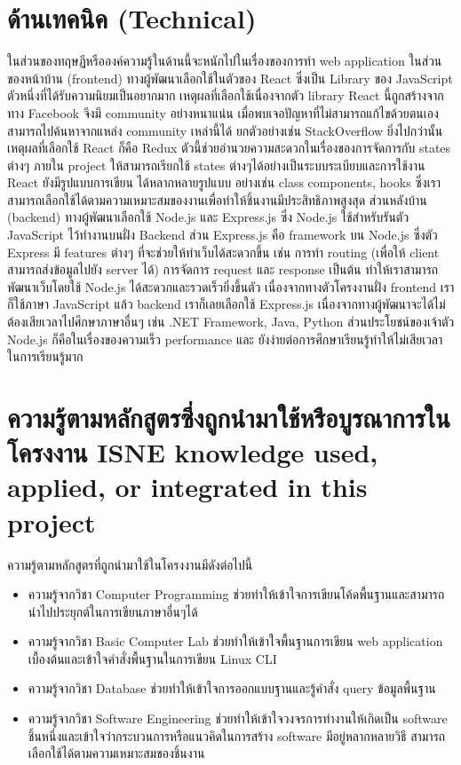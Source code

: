 \section{ด้านเทคนิค (Technical)}
ในส่วนของทฤษฏีหรือองค์ความรู้ในด้านนี้จะหนักไปในเรื่องของการทำ
web application ในส่วนของหน้าบ้าน (frontend) ทางผู้พัฒนาเลือกใช้ในตัวของ
React \cite{React} ซึ่งเป็น Library ของ JavaScript ตัวหนึ่งที่ได้รับความนิยมเป็นอยากมาก เหตุผลที่เลือกใช้เนื่องจากตัว library React นี้ถูกสร้างจากทาง Facebook 
จึงมี community อย่างหนาแน่น  เมื่อพบเจอปัญหาที่ไม่สามารถแก้ไขด้วยตนเอง สามารถไปค้นหาจากแหล่ง community เหล่านี้ได้ ยกตัวอย่างเช่น StackOverflow 
ยิ่งไปกว่านั้นเหตุผลที่เลือกใช้ React ก็คือ Redux \cite{Redux} ตัวนี้ช่วยอำนวยความสะดวกในเรื่องของการจัดการกับ states ต่างๆ  ภายใน project ให้สามารถเรียกใช้ states ต่างๆได้อย่างเป็นระบบระเบียบและการใช้งาน React ยังมีรูปแบบการเขียน
ได้หลากหลายรูปแบบ อย่างเช่น class components, hooks ซึ่งเราสามารถเลือกใช้ได้ตามความเหมาะสมของงานเพื่อทำให้ชิ้นงานมีประสิทธิภาพสูงสุด
ส่วนหลังบ้าน (backend) ทางผู้พัฒนาเลือกใช้ Node.js \cite{NodeJs}
และ Express.js \cite{Express} ซึ่ง Node.js ใช้สำหรับรันตัว JavaScript ไว้ทำงานบนฝั่ง Backend ส่วน Express.js คือ  framework บน Node.js 
ซึ่งตัว Express มี features ต่างๆ  ที่จะช่วยให้ทำเว็บได้สะดวกขึ้น เช่น การทำ routing (เพื่อให้ client สามารถส่งข้อมูลไปยัง server ได้) การจัดการ request และ response เป็นต้น  ทำให้เราสามารถพัฒนาเว็บโดยใช้ Node.js ได้สะดวกและรวดเร็วยิ่งขึ้นตัว
เนื่องจากทางตัวโครงงานฝั่ง frontend เราก็ใช้ภาษา JavaScript แล้ว backend เราก็เลยเลือกใช้ Express.js  เนื่องจากทางผู้พัฒนาจะได้ไม่ต้องเสียเวลาไปศึกษาภาษาอื่นๆ เช่น .NET Framework, Java, Python 
ส่วนประโยชน์ของเจ้าตัว Node.js ก็คือในเรื่องของความเร็ว performance และ ยังง่ายต่อการศึกษาเรียนรู้ทำให้ไม่เสียเวลาในการเรียนรู้มาก


\section{\ifcpe%
ความรู้ตามหลักสูตรซึ่งถูกนำมาใช้หรือบูรณาการในโครงงาน
\else%
ISNE knowledge used, applied, or integrated in this project
\fi
}

ความรู้ตามหลักสูตรที่ถูกนำมาใช้ในโครงงานมีดังต่อไปนี้
\begin{itemize}
  \item ความรู้จากวิชา Computer Programming ช่วยทำให้เข้าใจการเขียนโค้ดพื้นฐานและสามารถนำไปประยุกต์ในการเขียนภาษาอื่นๆได้
  \item ความรู้จากวิชา Basic Computer Lab ช่วยทำให้เข้าใจพื้นฐานการเขียน web application เบื้องต้นและเข้าใจคำสั่งพื้นฐานในการเขียน Linux CLI
  \item ความรู้จากวิชา Database ช่วยทำให้เข้าใจการออกแบบฐานและรู้คำสั่ง query ข้อมูลพื้นฐาน
  \item ความรู้จากวิชา Software Engineering ช่วยทำให้เข้าใจวงจรการทำงานให้เกิดเป็น software ชิ้นหนึ่งและเข้าใจว่ากระบวนการหรือแนวคิดในการสร้าง software มีอยู่หลากหลายวิธี สามารถเลือกใช้ได้ตามความเหมาะสมของชิ้นงาน 
  
\end{itemize}


